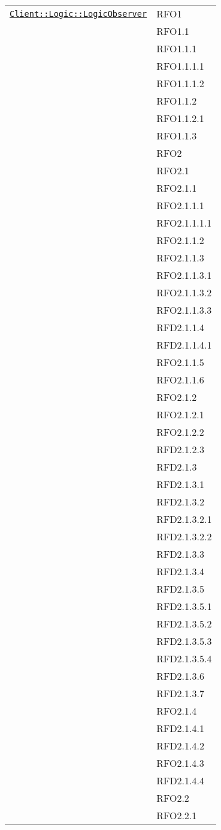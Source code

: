 \begin{longtable}{|>{\centering}m{10cm}|m{3cm}<{\centering}|}
\hyperref[Client::Logic::LogicObserver]{\texttt{Client::Logic::LogicObserver}} & RFO1\\
& RFO1.1\\
& RFO1.1.1\\
& RFO1.1.1.1\\
& RFO1.1.1.2\\
& RFO1.1.2\\
& RFO1.1.2.1\\
& RFO1.1.3\\
& RFO2\\
& RFO2.1\\
& RFO2.1.1\\
& RFO2.1.1.1\\
& RFO2.1.1.1.1\\
& RFO2.1.1.2\\
& RFO2.1.1.3\\
& RFO2.1.1.3.1\\
& RFO2.1.1.3.2\\
& RFO2.1.1.3.3\\
& RFD2.1.1.4\\
& RFD2.1.1.4.1\\
& RFO2.1.1.5\\
& RFO2.1.1.6\\
& RFO2.1.2\\
& RFO2.1.2.1\\
& RFO2.1.2.2\\
& RFD2.1.2.3\\
& RFD2.1.3\\
& RFD2.1.3.1\\
& RFD2.1.3.2\\
& RFD2.1.3.2.1\\
& RFD2.1.3.2.2\\
& RFD2.1.3.3\\
& RFD2.1.3.4\\
& RFD2.1.3.5\\
& RFD2.1.3.5.1\\
& RFD2.1.3.5.2\\
& RFD2.1.3.5.3\\
& RFD2.1.3.5.4\\
& RFD2.1.3.6\\
& RFD2.1.3.7\\
& RFO2.1.4\\
& RFD2.1.4.1\\
& RFD2.1.4.2\\
& RFO2.1.4.3\\
& RFD2.1.4.4\\
& RFO2.2\\
& RFO2.2.1\\

\end{longtable}
